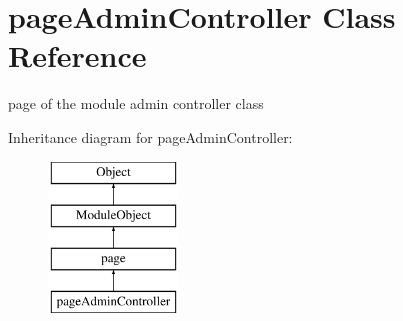 \hypertarget{classpageAdminController}{\section{page\-Admin\-Controller Class Reference}
\label{classpageAdminController}
}


page of the module admin controller class  


Inheritance diagram for page\-Admin\-Controller\-:\begin{figure}[H]
\begin{center}
\leavevmode
\includegraphics[height=4.000000cm]{classpageAdminController}
\end{center}
\end{figure}

